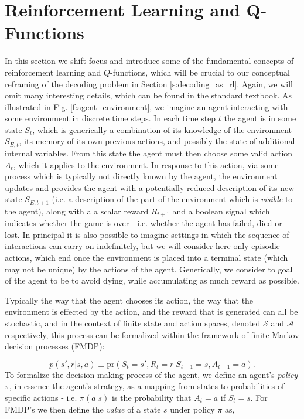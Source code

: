 \documentclass[twocolumn,preprintnumbers,amsmath,amssymb,notitlepage,nofootinbib,longbibliography,superscriptaddress,aps,pra,10pt]{revtex4-1}
\begin{document}
\section{Reinforcement Learning and Q-Functions}\label{s:reinforcement_learning}

    In this section we shift focus and introduce some of the fundamental concepts of reinforcement learning and $Q$-functions, which will be crucial to our conceptual reframing of the decoding problem in Section \ref{s:decoding_as_rl}. Again, we will omit many interesting details, which can be found in the standard textbook. As illustrated in Fig. \ref{f:agent_environment}, we imagine an agent interacting with some environment in discrete time steps. In each time step $t$ the agent is in some state $S_t$, which is generically a combination of its knowledge of the environment $S_{E,t}$, its memory of its own previous actions, and possibly the state of additional internal variables. From this state the agent must then choose some valid action $A_t$, which it applies to the environment. In response to this action, via some process which is typically not directly known by the agent, the environment updates and provides the agent with a potentially reduced description of its new state $S_{E,t+1}$ (i.e. a description of the part of the environment which is \textit{visible} to the agent), along with a a scalar reward $R_{t+1}$ and a boolean signal which indicates whether the game is over - i.e. whether the agent has failed, died or lost. In principal it is also possible to imagine settings in which the sequence of interactions can carry on indefinitely, but we will consider here only episodic actions, which end once the environment is placed into a terminal state (which may not be unique) by the actions of the agent. Generically, we consider to goal of the agent to be to avoid dying, while accumulating as much reward as possible.

    Typically the way that the agent chooses its action, the way that the environment is effected by the action, and the reward that is generated can all be stochastic, and in the context of finite state and action spaces, denoted $\mathcal{S}$ and $\mathcal{A}$ respectively, this process can be formalized within the framework of finite Markov decision processes (FMDP):

    \begin{equation}
        p(s',r|s,a) \equiv \mathrm{pr}(S_t = s',R_t = r|S_{t-1} = s, A_{t-1} = a).
    \end{equation}
    To formalize the decision making process of the agent, we define an agent's \textit{policy} $\pi$, in essence the agent's strategy, as a mapping from states to probabilities of specific actions - i.e. $\pi(a|s)$ is the probability that $A_t = a$ if $S_t = s$. For FMDP's we then define the \textit{value} of a state $s$ under policy $\pi$ as,
\end{document}
